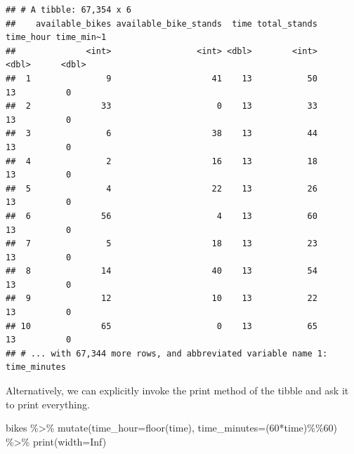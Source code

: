 \documentclass[
]{book}
\newenvironment{Shaded}{\begin{snugshade}}{\end{snugshade}}
\newcommand{\AttributeTok}[1]{\textcolor[rgb]{0.77,0.63,0.00}{#1}}
\newcommand{\ConstantTok}[1]{\textcolor[rgb]{0.00,0.00,0.00}{#1}}
\newcommand{\DecValTok}[1]{\textcolor[rgb]{0.00,0.00,0.81}{#1}}
\newcommand{\FunctionTok}[1]{\textcolor[rgb]{0.00,0.00,0.00}{#1}}
\newcommand{\NormalTok}[1]{#1}
\newcommand{\SpecialCharTok}[1]{\textcolor[rgb]{0.00,0.00,0.00}{#1}}
\begin{document}
\begin{verbatim}
## # A tibble: 67,354 x 6
##    available_bikes available_bike_stands  time total_stands time_hour time_min~1
##              <int>                 <int> <dbl>        <int>     <dbl>      <dbl>
##  1               9                    41    13           50        13          0
##  2              33                     0    13           33        13          0
##  3               6                    38    13           44        13          0
##  4               2                    16    13           18        13          0
##  5               4                    22    13           26        13          0
##  6              56                     4    13           60        13          0
##  7               5                    18    13           23        13          0
##  8              14                    40    13           54        13          0
##  9              12                    10    13           22        13          0
## 10              65                     0    13           65        13          0
## # ... with 67,344 more rows, and abbreviated variable name 1: time_minutes
\end{verbatim}

Alternatively, we can explicitly invoke the print method of the tibble and ask it to print everything.

\begin{Shaded}
\begin{Highlighting}[]
\NormalTok{bikes }\SpecialCharTok{\%\textgreater{}\%}
  \FunctionTok{mutate}\NormalTok{(}\AttributeTok{time\_hour=}\FunctionTok{floor}\NormalTok{(time), }\AttributeTok{time\_minutes=}\NormalTok{(}\DecValTok{60}\SpecialCharTok{*}\NormalTok{time)}\SpecialCharTok{\%\%}\DecValTok{60}\NormalTok{) }\SpecialCharTok{\%\textgreater{}\%}
  \FunctionTok{print}\NormalTok{(}\AttributeTok{width=}\ConstantTok{Inf}\NormalTok{)}
\end{Highlighting}
\end{Shaded}
\end{document}
